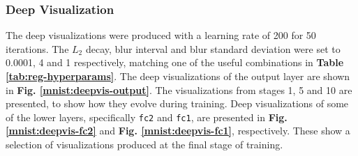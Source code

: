 \subsubsection{Deep Visualization}

The deep visualizations were produced with a learning rate of 200 for 50 iterations. The $L_2$ decay, blur interval and blur standard deviation were set to 0.0001, 4 and 1 respectively, matching one of the useful combinations in \textbf{Table \ref{tab:reg-hyperparams}}. The deep visualizations of the output layer are shown in \textbf{Fig. \ref{mnist:deepvis-output}}. The visualizations from stages 1, 5 and 10 are presented, to show how they evolve during training. Deep visualizations of some of the lower layers, specifically \texttt{fc2} and \texttt{fc1}, are presented in \textbf{Fig. \ref{mnist:deepvis-fc2}} and \textbf{Fig. \ref{mnist:deepvis-fc1}}, respectively. These show a selection of visualizations produced at the final stage of training.

